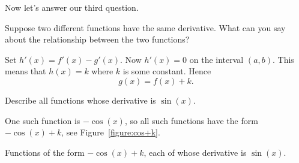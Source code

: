 Now let's answer our third question.

\begin{example}
Suppose two different functions have the same derivative. What can you
say about the relationship between the two functions?
\end{example}

\begin{solution}
Set $h'(x) = f'(x) -g'(x)$. Now $h'(x) = 0$ on the interval
$(a,b)$. This means that $h(x) = k$ where $k$ is some constant. Hence
\[
g(x) = f(x) + k.
\]
\end{solution}


\begin{example}
Describe all functions whose derivative is $\sin(x)$.
\end{example}

\begin{solution}
One such function is $-\cos(x)$, so all such functions have the form
$-\cos(x)+k$, see Figure~\ref{figure:cos+k}.
\end{solution}
\begin{marginfigure}[0in]
\caption{Functions of the form $-\cos(x)+k$, each of whose derivative is $\sin(x)$.}
\label{figure:cos+k}
\end{marginfigure}

